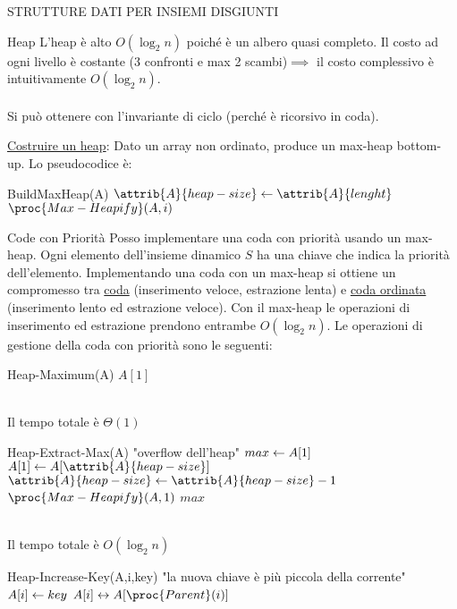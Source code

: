 \documentclass[8pt]{extarticle}
\begin{document}
\begin{formulario}
\begin{myParagraph}{STRUTTURE DATI PER INSIEMI DISGIUNTI}
\begin{subParagraph}{Heap}
L'heap è alto $O(\log_2 n)$ poiché è un albero quasi completo. Il costo ad ogni livello è costante (3 confronti e max 2 scambi)$\implies$ il costo complessivo è intuitivamente $O(\log_2 n)$. \\
\\ 
Si può ottenere con l'invariante di ciclo (perché è ricorsivo in coda).
				\begin{descr}{1}
					\item[\underline{Costruire un heap}:] Dato un array non ordinato, produce un max-heap bottom-up. Lo pseudocodice è: 
				\end{descr}
				\begin{code}{BuildMaxHeap(A)}
\li $\attrib{A}{heap-size}\get \attrib{A}{lenght}$
\li {}
	\li $\proc{Max-Heapify}(A,i)$
\END
				\end{code}
			\begin{subParagraph}{Code con Priorità}
Posso implementare una coda con priorità usando un max-heap. Ogni elemento dell'insieme dinamico $S$ ha una chiave che indica la priorità dell'elemento. Implementando una coda con un max-heap si ottiene un compromesso tra \underline{coda} (inserimento veloce, estrazione lenta) e \underline{coda ordinata} (inserimento lento ed estrazione veloce). Con il max-heap le operazioni di inserimento ed estrazione prendono entrambe $O(\log_2 n)$. Le operazioni di gestione della coda con priorità sono le seguenti:
				\begin{code}{Heap-Maximum(A)}
\li \RETURN $A[1]$
				\end{code}
\\
Il tempo totale è $\Theta(1)$\\
				\begin{code}{Heap-Extract-Max(A)}
\li {}
	\li \Error "overflow dell'heap"
\END
\li $max\leftarrow A[1]$
\li $A[1]\get A[\attrib{A}{heap-size}]$
\li $\attrib{A}{heap-size}\get \attrib{A}{heap-size}-1$
\li $\proc{Max-Heapify}(A,1)$
\li \RETURN $max$
				\end{code}
			\end{subParagraph}
\\
Il tempo totale è $O(\log_2 n)$\\
				\begin{code}{Heap-Increase-Key(A,i,key)}
\li {}
	\li \Error "la nuova chiave è più piccola della corrente"
\END
\li $A[i]\leftarrow key$
\li {}
	\li {} $A[i] \sse A[\proc{Parent}(i)]$

\end{code}
\end{subParagraph}
\end{myParagraph}
\end{formulario}
\end{document}
